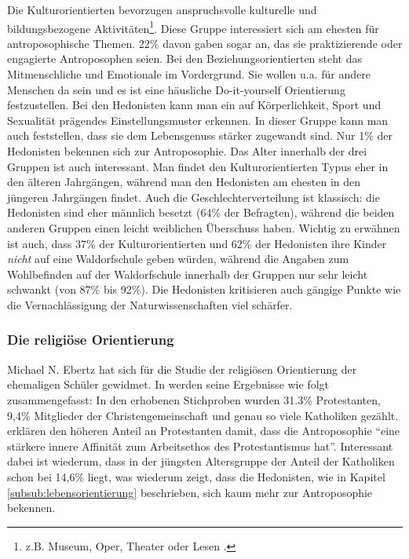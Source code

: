 Die Kulturorientierten bevorzugen anspruchsvolle kulturelle und bildungsbezogene Aktivitäten\footnote{z.B. Museum, Oper, Theater oder Lesen \citep[vgl.][S. 17]{randoll07}.}. 
Diese Gruppe interessiert sich am ehesten für antroposophische Themen. 
22\% davon gaben sogar an, das sie praktizierende oder engagierte Antroposophen seien. 
Bei den Beziehungsorientierten steht das Mitmenschliche und Emotionale im Vordergrund. 
Sie wollen u.a. für andere Menschen da sein und es ist eine häusliche Do-it-yourself Orientierung festzustellen. 
Bei den Hedonisten kann man ein auf Körperlichkeit, Sport und Sexualität prägendes Einstellungsmuster erkennen. 
In dieser Gruppe kann man auch feststellen, dass sie dem Lebensgenuss stärker zugewandt sind. 
Nur 1\% der Hedonisten bekennen sich zur Antroposophie. 
Das Alter innerhalb der drei Gruppen ist auch interessant. 
Man findet den Kulturorientierten Typus eher in den älteren Jahrgängen, während man den Hedonisten am ehesten in den jüngeren Jahrgängen findet. 
Auch die Geschlechterverteilung ist klassisch: die Hedonisten sind eher männlich besetzt (64\% der Befragten), während die beiden anderen Gruppen einen leicht weiblichen Überschuss haben. 
Wichtig zu erwähnen ist auch, dass 37\% der Kulturorientierten und 62\% der Hedonisten ihre Kinder \emph{nicht} auf eine Waldorfschule geben würden, während die Angaben zum Wohlbefinden auf der Waldorfschule innerhalb der Gruppen nur sehr leicht schwankt (von 87\% bis 92\%). 
Die Hedonisten kritisieren auch gängige Punkte wie die Vernachlässigung der Naturwissenschaften viel schärfer. 

\subsubsection{Die religiöse Orientierung}

Michael N. Ebertz hat sich für die Studie der religiösen Orientierung der ehemaligen Schüler gewidmet. 
In \citet[][S. 18f]{randoll07} werden seine Ergebnisse wie folgt zusammengefasst: In den erhobenen Stichproben wurden 31.3\% Protestanten, 9,4\% Mitglieder der Christengemeinschaft und genau so viele Katholiken gezählt. 
\citet[][S. 18]{randoll07} erklären den höheren Anteil an Protestanten damit, dass die Antroposophie \enquote{eine stärkere innere Affinität zum Arbeitsethos des Protestantismus hat}. 
Interessant dabei ist wiederum, dass in der jüngsten Altersgruppe der Anteil der Katholiken schon bei 14,6\% liegt, was wiederum zeigt, dass die Hedonisten, wie in Kapitel \ref{subsub:lebensorientierung} beschrieben, sich kaum mehr zur Antroposophie bekennen. 

